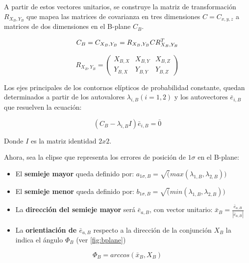 A partir de estos vectores unitarios, se construye la matriz de transformaci\'on $R_{X_{B},Y_{B}}$ que mapea las matrices de covarianza en tres dimensiones $C=C_{x,y,z}$ a matrices de dos dimensiones en el B-plane $C_{B}$.

\begin{equation}
  C_{B} = C_{{X_{B},Y_{B}}} = R_{X_{B},Y_{B}} C R^{T}_{X_{B},Y_{B}}\\
\end{equation}

\begin{equation}
  R_{X_{B},Y_{B}} = 
  \begin{pmatrix}
    X_{B,X} & X_{B,Y} & X_{B,Z}\\
    Y_{B,X} & Y_{B,Y} & Y_{B,Z}
  \end{pmatrix}
\end{equation}

Los ejes principales de los contornos el\'ipticos de probabilidad constante, quedan determinados a partir de los autovalores $\lambda_{i,B}(i=1,2)$ y los autovectores $\bar{e}_{i,B}$ que resuelven la ecuaci\'on:

\begin{equation}
(C_{B} - \lambda_{i,B} I) \bar{e}_{i,B} = \bar{0}
\end{equation}

Donde $I$ es la matriz identidad $2x2$.

Ahora, sea la elipse que representa los errores de posici\'on de $1\sigma$ en el B-plane:\\

\begin{itemize}
 \item El {\bf{semieje mayor}} queda definido por: $a_{1\sigma,B}=\sqrt(max(\lambda_{1,B},\lambda_{2,B}))$
 \item El {\bf{semieje menor}} queda definido por: $b_{1\sigma,B}=\sqrt(min(\lambda_{1,B},\lambda_{2,B}))$
 \item La {\bf{direcci\'on del semieje mayor}} ser\'a $\bar{e}_{a,B}$, con vector unitario: $ \bar{x}_{B}=\frac{\bar{e}_{a,B}}{|\bar{e}_{a,B}|}$ 
 \item La {\bf{orientiaci\'on de $\bar{e}_{a,B}$}} respecto a la direcci\'on de la conjunci\'on $X_{B}$ la indica el \'angulo $\Phi_{B}$ (ver \ref{fig:bplane})
\end{itemize}

\begin{equation}
 \Phi_{B}= arccos(\bar{x}_{B},X_{B})
\end{equation}

